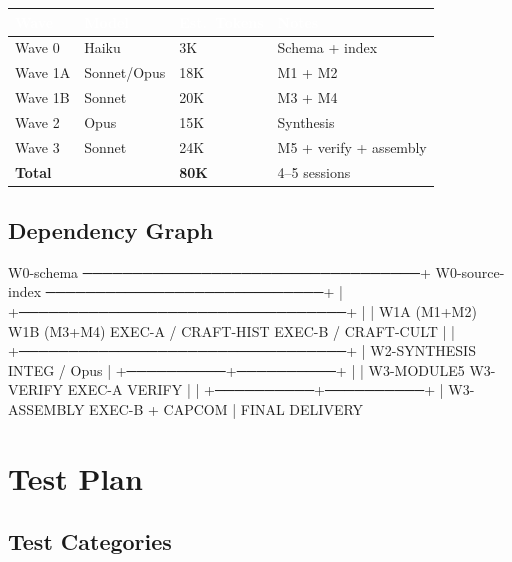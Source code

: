 \documentclass[11pt,letterpaper]{article}
\newcommand{\tableheader}[1]{\textbf{\sffamily\textcolor{white}{#1}}}
\begin{document}
\begin{center}
\begin{tabularx}{\textwidth}{L{4cm}C{2.5cm}C{2.5cm}X}
\toprule
{}
\tableheader{Wave} & \tableheader{Model} & \tableheader{Est.\ Tokens} & \tableheader{Notes} \\
\midrule
Wave 0 & Haiku & 3K & Schema + index \\
Wave 1A & Sonnet/Opus & 18K & M1 + M2 \\
Wave 1B & Sonnet & 20K & M3 + M4 \\
Wave 2 & Opus & 15K & Synthesis \\
Wave 3 & Sonnet & 24K & M5 + verify + assembly \\
\midrule
\textbf{Total} & & \textbf{80K} & 4--5 sessions \\
\bottomrule
\end{tabularx}
\end{center}

\subsection{Dependency Graph}

\begin{asciibox}
W0-schema ──────────────────────────────────+
W0-source-index ────────────────────────────+
                                            |
          +─────────────────────────────────+
          |                                 |
    W1A (M1+M2)                      W1B (M3+M4)
    EXEC-A / CRAFT-HIST              EXEC-B / CRAFT-CULT
          |                                 |
          +─────────────────────────────────+
                          |
                    W2-SYNTHESIS
                    INTEG / Opus
                          |
               +──────────+──────────+
               |                     |
          W3-MODULE5            W3-VERIFY
          EXEC-A                VERIFY
               |                     |
               +──────────+──────────+
                          |
                    W3-ASSEMBLY
                    EXEC-B + CAPCOM
                          |
                    FINAL DELIVERY
\end{asciibox}

\section{Test Plan}

\subsection{Test Categories}
\end{document}
